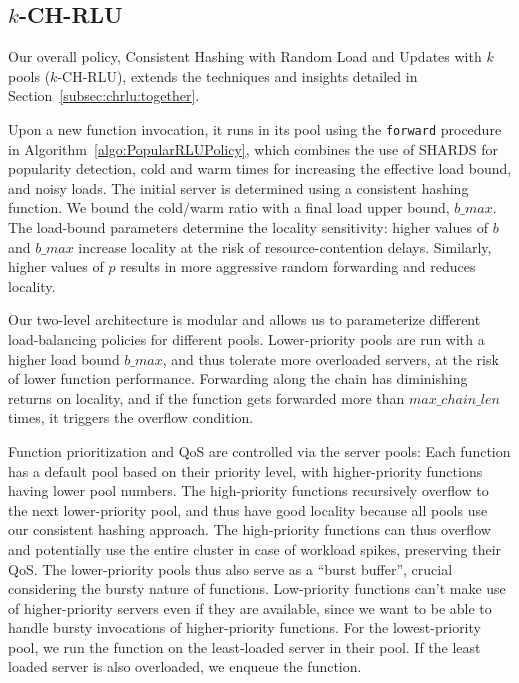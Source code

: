 \subsection{$k$-CH-RLU}
\label{subsec:kchrlu}

Our overall policy, Consistent Hashing with Random Load and Updates with $k$ pools ($k$-CH-RLU), extends the techniques and insights detailed in Section~\ref{subsec:chrlu:together}.

Upon a new function invocation, it runs in its pool using the \texttt{forward} procedure in Algorithm~\ref{algo:PopularRLUPolicy}, which combines the use of SHARDS for popularity detection, cold and warm times for increasing the effective load bound, and noisy loads. 
The initial server is determined using a consistent hashing function. 
We bound the cold/warm ratio with a final load upper bound, $b\_max$.
The load-bound parameters determine the locality sensitivity: higher values of $b$ and $b\_max$ increase locality at the risk of resource-contention delays.
Similarly, higher values of $p$ results in more aggressive random forwarding and reduces locality. 

Our two-level architecture is modular and allows us to parameterize different load-balancing policies for different pools.
Lower-priority pools are run with a higher load bound $b\_max$, and thus tolerate more overloaded servers, at the risk of lower function performance.
Forwarding along the chain has diminishing returns on locality, and if the function gets forwarded more than $max\_chain\_len$ times, it triggers the overflow condition.

Function prioritization and QoS are controlled via the server pools: Each function has a default pool based on their priority level, with higher-priority functions having lower pool numbers. 
The high-priority functions recursively overflow to the next lower-priority pool, and thus have good locality because all pools use our consistent hashing approach. 
The high-priority functions can thus overflow and potentially use the entire cluster in case of workload spikes, preserving their QoS. 
The lower-priority pools thus also serve as a ``burst buffer'', crucial considering the bursty nature of functions. 
Low-priority functions can't make use of higher-priority servers even if they are available, since we want to be able to handle bursty invocations of higher-priority functions. 
For the lowest-priority pool, we run the function on the least-loaded server in their pool. 
%
If the least loaded server is also overloaded, we enqueue the function.

